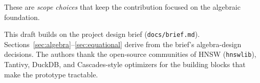 \documentclass[acmsmall,review,anonymous]{acmart}
\theoremstyle{plain}
\theoremstyle{definition}
\theoremstyle{remark}
\begin{document}
These are \emph{scope choices} that keep the contribution focused
on the algebraic foundation.

\begin{acks}
This draft builds on the project design brief
(\texttt{docs/brief.md}). Sections~\ref{sec:algebra}--\ref{sec:equational}
derive from the brief's algebra-design decisions. The authors thank
the open-source communities of HNSW (\texttt{hnswlib}), Tantivy,
DuckDB, and Cascades-style optimizers for the building blocks that
make the prototype tractable.
\end{acks}

\end{document}
